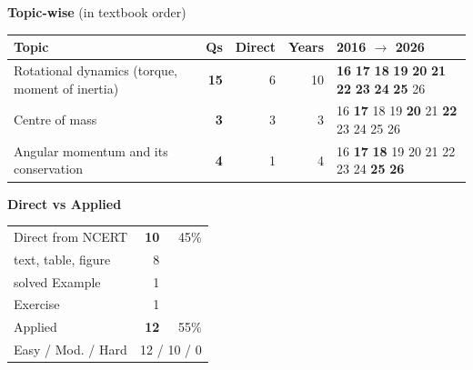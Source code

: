 {\small\textbf{\color{crimson}Topic-wise} (in textbook order)\par\smallskip
\begin{tabularx}{\linewidth}{@{}>{\raggedright\arraybackslash}Xrrrl@{}}\toprule
Topic & Qs & Direct & Years & 2016 $\rightarrow$ 2026\\\midrule
Rotational dynamics (torque, moment of inertia) & \textbf{15} & 6 & 10 & {\scriptsize \textbf{16} \textbf{17} \textbf{18} \textbf{19} \textbf{20} \textbf{21} \textbf{22} \textbf{23} \textbf{24} \textbf{25} {\color{gray!45}26}}\\
Centre of mass & \textbf{3} & 3 & 3 & {\scriptsize {\color{gray!45}16} \textbf{17} {\color{gray!45}18} {\color{gray!45}19} \textbf{20} {\color{gray!45}21} \textbf{22} {\color{gray!45}23} {\color{gray!45}24} {\color{gray!45}25} {\color{gray!45}26}}\\
Angular momentum and its conservation & \textbf{4} & 1 & 4 & {\scriptsize {\color{gray!45}16} \textbf{17} \textbf{18} {\color{gray!45}19} {\color{gray!45}20} {\color{gray!45}21} {\color{gray!45}22} {\color{gray!45}23} {\color{gray!45}24} \textbf{25} \textbf{26}}\\
\bottomrule\end{tabularx}}\par\medskip
\begin{minipage}[t]{0.34\linewidth}{\small\textbf{\color{crimson}Direct vs Applied}\par\smallskip
\begin{tabular}{@{}lrr@{}}\toprule
Direct from NCERT & \textbf{10} & 45\%\\
\quad text, table, figure & 8 &\\
\quad solved Example & 1 &\\
\quad Exercise & 1 &\\
Applied & \textbf{12} & 55\%\\\midrule
Easy / Mod. / Hard & \multicolumn{2}{r}{12 / 10 / 0}\\\bottomrule
\end{tabular}}\end{minipage}\hfill
